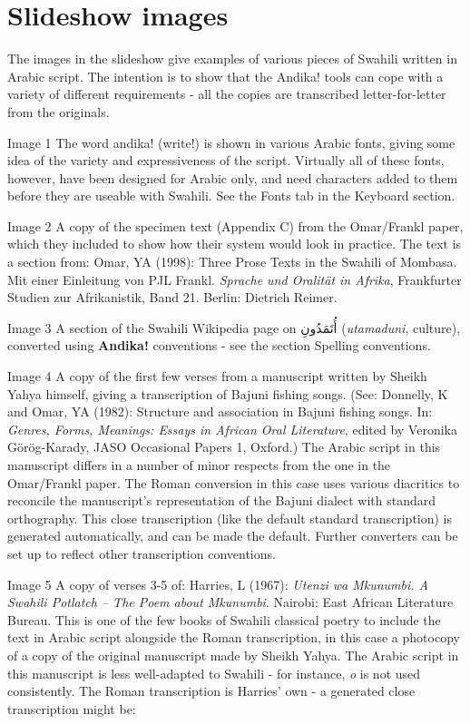 \documentclass[a4paper,10pt]{article}
\newcommand{\AS}[1]{\fontspec[Script=Arabic, Scale=1.5]{Scheherazade} #1\normalfont} %
\begin{document}
\section{Slideshow images}

The images in the slideshow give examples of various pieces of Swahili written in Arabic script. The intention is to show that the Andika! tools can cope with a variety of different requirements - all the copies are transcribed letter-for-letter from the originals.

Image 1
The word andika! (write!) is shown in various Arabic fonts, giving some idea of the variety and expressiveness of the script. Virtually all of these fonts, however, have been designed for Arabic only, and need characters added to them before they are useable with Swahili. See the Fonts tab in the Keyboard section.

Image 2
A copy of the specimen text (Appendix C) from the Omar/Frankl paper, which they included to show how their system would look in practice. The text is a section from: Omar, YA (1998): Three Prose Texts in the Swahili of Mombasa. Mit einer Einleitung von PJL Frankl. \textit{Sprache und Oralität in Afrika}, Frankfurter Studien zur Afrikanistik, Band 21. Berlin: Dietrich Reimer.

Image 3
A section of the Swahili Wikipedia page on \AS{أُتَمَدُونِ} (\textit{utamaduni}, culture), converted using \textbf{Andika!} conventions - see the section Spelling conventions.

Image 4
A copy of the first few verses from a manuscript written by Sheikh Yahya himself, giving a transcription of Bajuni fishing songs. (See: Donnelly, K and Omar, YA (1982): Structure and association in Bajuni fishing songs. In: \textit{Genres, Forms, Meanings: Essays in African Oral Literature}, edited by Veronika Görög-Karady, JASO Occasional Papers 1, Oxford.) The Arabic script in this manuscript differs in a number of minor respects from the one in the Omar/Frankl paper. The Roman conversion in this case uses various diacritics to reconcile the manuscript's representation of the Bajuni dialect with standard orthography. This close transcription (like the default standard transcription) is generated automatically, and can be made the default. Further converters can be set up to reflect other transcription conventions.

Image 5
A copy of verses 3-5 of: Harries, L (1967): \textit{Utenzi wa Mkunumbi. A Swahili Potlatch – The Poem about Mkunumbi}. Nairobi: East African Literature Bureau. This is one of the few books of Swahili classical poetry to include the text in Arabic script alongside the Roman transcription, in this case a photocopy of a copy of the original manuscript made by Sheikh Yahya. The Arabic script in this manuscript is less well-adapted to Swahili - for instance, \textit{o} is not used consistently. The Roman transcription is Harries' own - a generated close transcription might be:
\end{document}

